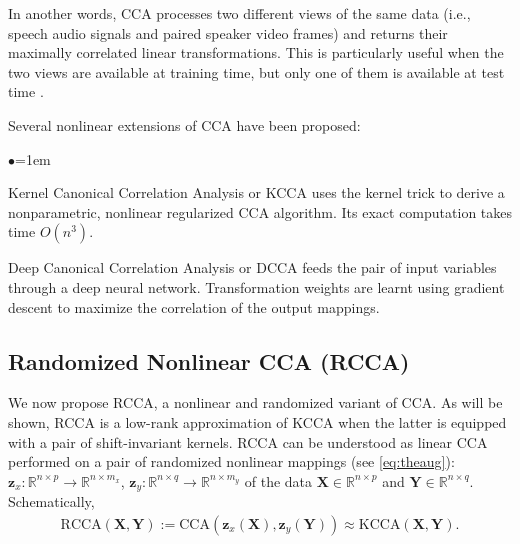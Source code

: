 \documentclass{article}
\begin{document}
  In another words, CCA processes two different views of the same data (i.e.,
  speech audio signals and paired speaker video frames) and returns their
  maximally correlated linear transformations. This is particularly useful when
  the two views are available at training time, but only one of them is
  available at test time \citep{Kakade07,Chaudhuri09,Vapnik09}.
  
  Several nonlinear extensions of CCA have been proposed:
  \begin{list}{$\bullet$}{\leftmargin=1em}
    \vspace*{-5pt}
    \setlength{\itemsep}{-1pt}
    \item Kernel Canonical Correlation Analysis or KCCA \citep{laiFy00,Bach02}
    uses the {kernel trick} to derive a nonparametric, nonlinear regularized
    CCA algorithm. Its exact computation takes time $O(n^3)$.
    \item Deep Canonical Correlation Analysis or DCCA \citep{Galen13} feeds the
    pair of input variables through a deep neural network. Transformation
    weights are learnt using gradient descent to maximize the correlation of
    the output mappings.
  \end{list}

  \subsection{Randomized Nonlinear CCA (RCCA)}\label{sec:rcca}
  We now propose RCCA, a nonlinear and randomized variant of CCA. As will be
  shown, RCCA is a low-rank approximation of KCCA when the latter is equipped
  with a pair of shift-invariant kernels.  RCCA can be understood as linear CCA
  performed on a pair of randomized nonlinear mappings (see \ref{eq:theaug}):
  $\bm z_x : \mathbb{R}^{n\times p}\rightarrow \mathbb{R}^{n\times m_x}$, $\bm
  z_y : \mathbb{R}^{n\times q} \rightarrow \mathbb{R}^{n\times m_y}$ of the
  data $\bm X \in \mathbb{R}^{n \times p}$ and $\bm Y \in \mathbb{R}^{n \times
  q}$.  Schematically,
  \begin{align*}
    \mathrm{RCCA}(\bm X, \bm Y) :=
    \mathrm{CCA}(\bm z_x(\bm X),\bm z_y(\bm Y))
    \approx \mathrm{KCCA}(\bm X, \bm Y).
  \end{align*}
 
\end{document}
